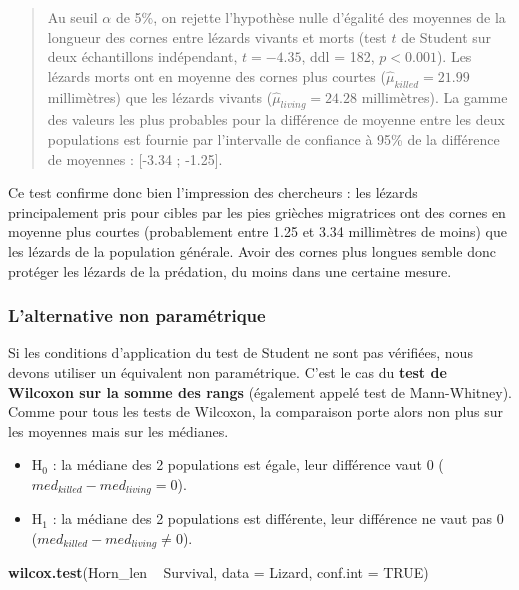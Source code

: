 \documentclass[
  a4paper,
]{article}
\newenvironment{Shaded}{\begin{snugshade}}{\end{snugshade}}
\newcommand{\DataTypeTok}[1]{\textcolor[rgb]{0.00,0.34,0.68}{#1}}
\newcommand{\KeywordTok}[1]{\textcolor[rgb]{0.12,0.11,0.11}{\textbf{#1}}}
\newcommand{\NormalTok}[1]{\textcolor[rgb]{0.12,0.11,0.11}{#1}}
\newcommand{\OperatorTok}[1]{\textcolor[rgb]{0.12,0.11,0.11}{#1}}
\newcommand{\OtherTok}[1]{\textcolor[rgb]{0.00,0.43,0.16}{#1}}
\newcommand{\StringTok}[1]{\textcolor[rgb]{0.75,0.01,0.01}{#1}}
\providecommand{\tightlist}{%
  \setlength{\itemsep}{0pt}\setlength{\parskip}{0pt}}
\begin{document}
\begin{quote}
Au seuil \(\alpha\) de 5\%, on rejette l'hypothèse nulle d'égalité des moyennes de la longueur des cornes entre lézards vivants et morts (test \(t\) de Student sur deux échantillons indépendant, \(t = -4.35\), ddl = 182, \(p < 0.001\)). Les lézards morts ont en moyenne des cornes plus courtes (\(\hat{\mu}_{killed} = 21.99\) millimètres) que les lézards vivants (\(\hat{\mu}_{living} = 24.28\) millimètres). La gamme des valeurs les plus probables pour la différence de moyenne entre les deux populations est fournie par l'intervalle de confiance à 95\% de la différence de moyennes : {[}-3.34 ; -1.25{]}.
\end{quote}

Ce test confirme donc bien l'impression des chercheurs : les lézards principalement pris pour cibles par les pies grièches migratrices ont des cornes en moyenne plus courtes (probablement entre 1.25 et 3.34 millimètres de moins) que les lézards de la population générale. Avoir des cornes plus longues semble donc protéger les lézards de la prédation, du moins dans une certaine mesure.

\hypertarget{lalternative-non-paramuxe9trique-2}{%
\subsubsection{L'alternative non paramétrique}\label{lalternative-non-paramuxe9trique-2}}

Si les conditions d'application du test de Student ne sont pas vérifiées, nous devons utiliser un équivalent non paramétrique. C'est le cas du \textbf{test de Wilcoxon sur la somme des rangs} (également appelé test de Mann-Whitney). Comme pour tous les tests de Wilcoxon, la comparaison porte alors non plus sur les moyennes mais sur les médianes.

\begin{itemize}
\tightlist
\item
  H\(_0\) : la médiane des 2 populations est égale, leur différence vaut 0 (\(med_{killed}-med_{living} = 0\)).
\item
  H\(_1\) : la médiane des 2 populations est différente, leur différence ne vaut pas 0 (\(med_{killed}-med_{living}\neq 0\)).
\end{itemize}

\begin{Shaded}
\begin{Highlighting}[]
\KeywordTok{wilcox.test}\NormalTok{(Horn_len }\OperatorTok{~}\StringTok{ }\NormalTok{Survival, }\DataTypeTok{data =}\NormalTok{ Lizard, }\DataTypeTok{conf.int =} \OtherTok{TRUE}\NormalTok{)}
\end{Highlighting}
\end{Shaded}
\end{document}
